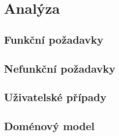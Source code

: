 
\chapter{Analýza}\label{ch:analýza}






\section{Funkční požadavky}\label{sec:funcniPozadavky}
\section{Nefunkční požadavky}\label{sec:nefuncniPozadavky}
\section{Uživatelské případy}\label{sec:uzivatelskePripady}
\section{Doménový model}\label{sec:domenovyModel}
